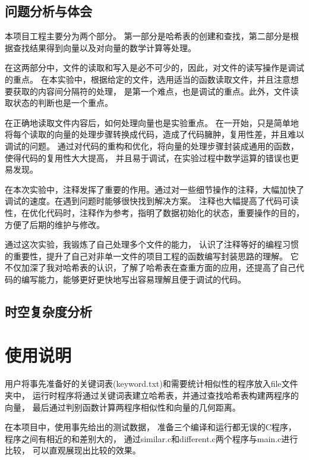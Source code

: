 \documentclass[a4paper]{article}
\begin{document}
    \subsection{问题分析与体会}\label{subsec:analysis}
    {{本项目工程主要分为两个部分。
    第一部分是哈希表的创建和查找，第二部分是根据查找结果得到向量以及对向量的数学计算等处理。}}

    {在这两部分中，文件的读取和写入是必不可少的，因此，对文件的读写操作是调试的重点。
    在本实验中，根据给定的文件，选用适当的函数读取文件，并且注意想要获取的内容间分隔符的处理，
    是第一个难点，也是调试的重点。此外，文件读取状态的判断也是一个重点。}

    {{在正确地读取文件内容后，如何处理向量也是实验重点。
    在一开始，只是简单地将每个读取的向量的处理步骤转换成代码，造成了代码臃肿，复用性差，并且难以调试的问题。
    通过对代码的重构和优化，将向量的处理步骤封装成通用的函数，使得代码的复用性大大提高，
    并且易于调试，在实验过程中数学运算的错误也更易发现。}}

    {{在本次实验中，注释发挥了重要的作用。通过对一些细节操作的注释，大幅加快了调试的速度。在遇到问题时能够很快找到解决方案。
    注释也大幅提高了代码可读性，在优化代码时，注释作为参考，指明了数据初始化的状态，重要操作的目的，方便了后期的维护与修改。}}

    {{通过这次实验，我锻炼了自己处理多个文件的能力，
    认识了注释等好的编程习惯的重要性，提升了自己对非单一文件的项目工程的函数编写封装思路的理解。
    它不仅加深了我对哈希表的认识，了解了哈希表在查重方面的应用，还提高了自己代码的编写能力，能够更好更快地写出容易理解且便于调试的代码。}}

    \subsection{时空复杂度分析}\label{subsec:analysis2}


    \section{使用说明}\label{sec:instrut}
    {{用户将事先准备好的关键词表(keyword.txt)和需要统计相似性的程序放入file文件夹中，
    运行时程序将通过关键词表建立哈希表，并通过查找哈希表构建两程序的向量，
    最后通过判别函数计算两程序相似性和向量的几何距离。}}

    {{在本项目中，使用事先给出的测试数据，
    准备三个编译和运行都无误的C程序，程序之间有相近的和差别大的，
    通过similar.c和different.c两个程序与main.c进行比较，
    可以直观展现出比较的效果。}}
\end{document}
